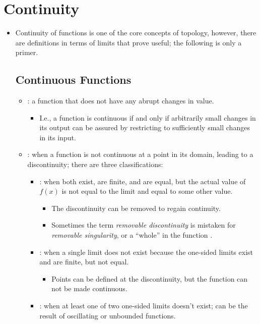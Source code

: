 \section{Continuity}
\begin{itemize}
  \item Continuity of functions is one of the core concepts of topology, however, there are definitions in terms of limits that prove useful; the following is only a primer.

  \subsection{Continuous Functions}
  \begin{itemize}
    \item {}: a function that does not have any abrupt changes in value.
      \begin{itemize}
        \item I.e., a function is continuous if and only if arbitrarily small changes in its output can be assured by restricting to sufficiently small changes in its input.
      \end{itemize}
    \item {}: when a function is not continuous at a point in its domain, leading to a discontinuity; there are three classifications:
      \begin{itemize}
        \item {}: when both \hyperref[ss: One-Sided Limit]{} exist, are finite, and are equal, but the actual value of \(f(x)\) is not equal to the limit and equal to some other value.
          \begin{itemize}
            \item The discontinuity can be removed to regain continuity.
            \item Sometimes the term \textit{removable discontinuity} is mistaken for \textit{removable singularity}, or a ``whole'' in the function .
          \end{itemize}
        \item {}: when a single limit does not exist because the one-sided limits exist and are finite, but not equal.
          \begin{itemize}
            \item Points can be defined at the discontinuity, but the function can not be made continuous.
          \end{itemize}
        \item {}: when at least one of two one-sided limits doesn't exist; can be the result of oscillating or unbounded functions.
      \end{itemize}
  \end{itemize}
  

\end{itemize}
